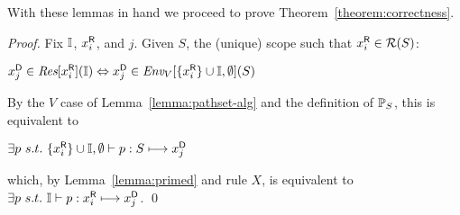 With these lemmas in hand we proceed to prove Theorem~\ref{theorem:correctness}.
\begin{proof} Fix $\mathbb{I}$, ${x}^{\mbox{\scriptsize\sf R}}_{i}$, and $j$. Given $S$, the (unique) scope such that ${x}^{\mbox{\scriptsize\sf R}}_{i} \in \mathcal{R}(S)$:\smallskip\\
\centerline{${x}^{\mbox{\scriptsize\sf D}}_{j} \in \mbox{\it{Res}}[{x}^{\mbox{\scriptsize\sf R}}_{i}](\mathbb{I}) \Leftrightarrow {x}^{\mbox{\scriptsize\sf D}}_{j} \in \mbox{\it{Env}}_{V}[\{{x}^{\mbox{\scriptsize\sf R}}_{i}\} \cup \mathbb{I},\emptyset](S)$\smallskip}
By the $V$ case of Lemma~\ref{lemma:pathset-alg} and the definition of $\mathbb{P}_{S}$, this is equivalent to\smallskip\\
\centerline{$\exists p\ s.t.\ \{{x}^{\mbox{\scriptsize\sf R}}_{i}\} \cup \mathbb{I},\emptyset \vdash p : S \longmapsto {x}^{\mbox{\scriptsize\sf D}}_{j}$\smallskip}
which, by Lemma~\ref{lemma:primed} and rule $X$, is equivalent to $\exists p\ s.t.\ \mathbb{I} \vdash p : {x}^{\mbox{\scriptsize\sf R}}_{i} \longmapsto {x}^{\mbox{\scriptsize\sf D}}_{j}$. \qed 
\end{proof}

\endinput

We have two key lemmas connecting the sets $\pathx{}$ with the calculus on the one hand
and the algorithm on the other.  First, $\pathx{V}$ consists of exactly the resolution 
paths described by the calculus:


